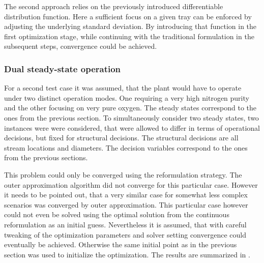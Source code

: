     The second approach relies on the previously introduced differentiable distribution function. Here a sufficient
    focus on a given tray can be enforced by adjusting the underlying standard deviation. By introducing that function
    in the first optimization stage, while continuing with the traditional formulation in the subsequent steps,
    convergence could be achieved.

    
    \subsubsection{Dual steady-state operation}
    For a second test case it was assumed, that the plant would have to operate under two distinct 
    operation modes. One requiring a very high nitrogen purity and the other focusing on very pure oxygen.
    The steady states correspond to the ones from the previous section. To simultaneously consider two steady 
    states, two instances were were considered, that were allowed to differ in terms of operational decisions, 
    but fixed for structural decisions. The structural decisions are all stream locations and diameters. 
    The decision variables correspond to the ones from the previous sections. 
    
    This problem could only be converged using the reformulation strategy. The outer approximation algorithm 
    did not converge for this particular case. However it needs to be pointed out, that a very similar case 
    for somewhat less complex scenarios was converged by outer approximation. This particular case however could
    not even be solved using the optimal solution from the continuous reformulation as an initial guess.
    Nevertheless it is assumed, that with careful tweaking of the optimization parameters and solver setting 
    convergence could eventually be achieved. 
    Otherwise the same initial point as in the previous section was used to initialize the optimization. 
    The results are summarized in .   
    
%        

